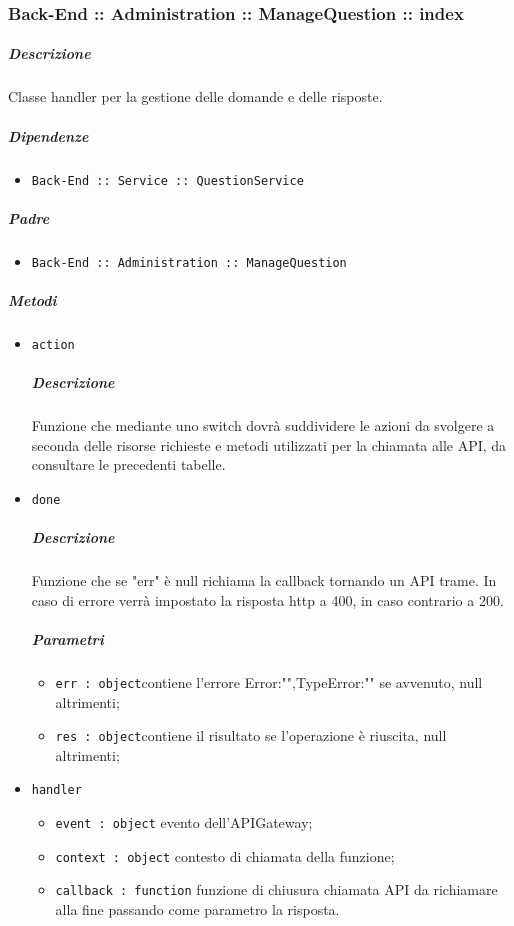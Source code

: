 \documentclass[../ManualeSviluppatore_v2.0.0.tex]{subfiles}
\begin{document}
\subsubsection{Back-End :: Administration :: ManageQuestion :: index}
\subparagraph{Descrizione} Classe handler per la gestione delle domande e delle risposte.
\subparagraph{Dipendenze}
\begin{itemize}
	\item \texttt{Back-End :: Service :: QuestionService}
\end{itemize}
\subparagraph{Padre}
\begin{itemize}
	\item \texttt{Back-End :: Administration :: ManageQuestion}
\end{itemize}
\subparagraph{Metodi}
\begin{itemize}
	\item \texttt{action}
	      \subparagraph{Descrizione} Funzione che mediante uno switch dovrà suddividere le azioni da svolgere a seconda delle risorse richieste e metodi utilizzati per la chiamata alle API, da consultare le precedenti tabelle.
	\item \texttt{done}
	      \subparagraph{Descrizione} Funzione che se "err" è null richiama la callback tornando un API trame. In caso di errore verrà impostato la risposta http a 400, in caso contrario a 200.
	      \subparagraph{Parametri}
	      \begin{itemize}
	      	\item \texttt{err : object}contiene l'errore {Error:"",TypeError:""} se avvenuto, null altrimenti;
	      	\item \texttt{res : object}contiene il risultato se l'operazione è riuscita, null altrimenti;
	      \end{itemize}
	\item \texttt{handler}
	      \begin{itemize}
	      	\item \texttt{event : object} evento dell'APIGateway;
	      	\item \texttt{context : object} contesto di chiamata della funzione;
	      	\item \texttt{callback : function} funzione di chiusura chiamata API da richiamare alla fine passando come parametro la risposta.
	      \end{itemize}
\end{itemize}
\end{document}
